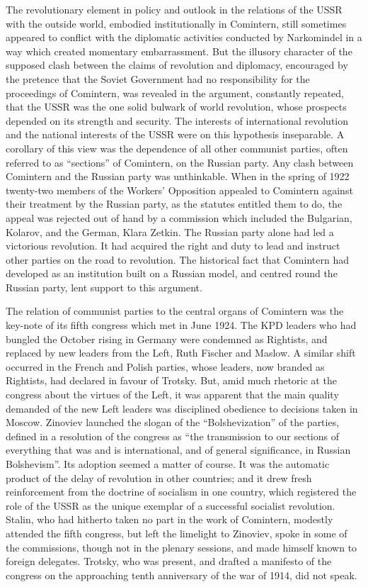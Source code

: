 The revolutionary element in policy and outlook in the relations of the USSR with the outside world, embodied institutionally in Comintern, still sometimes appeared to conflict with the diplomatic activities conducted by Narkomindel in a way which created momentary embarrassment. But the illusory character of the supposed clash between the claims of revolution and diplomacy, encouraged by the pretence that the Soviet Government had no responsibility for the proceedings of Comintern, was revealed in the argument, constantly repeated, that the USSR was the one solid bulwark of world revolution, whose prospects depended on its strength and security. The interests of international revolution and the national interests of the USSR were on this hypothesis inseparable. A corollary of this view was the dependence of all other communist parties, often referred to as ``sections'' of Comintern, on the Russian party. Any clash between Comintern and the Russian party was unthinkable. When in the spring of 1922 twenty-two members of the Workers' Opposition appealed to Comintern against their treatment by the Russian party, as the statutes entitled them to do, the appeal was rejected out of hand by a commission which included the Bulgarian, Kolarov, and the German, Klara Zetkin. The Russian party alone had led a victorious revolution. It had acquired the right and duty to lead and instruct other parties on the road to revolution. The historical fact that Comintern had developed as an institution built on a Russian model, and centred round the Russian party, lent support to this argument. 

The relation of communist parties to the central organs of Comintern was the key-note of its fifth congress which met in June 1924. The KPD leaders who had bungled the October rising in Germany were condemned as Rightists, and replaced by new leaders from the Left, Ruth Fischer and Maslow. A similar shift occurred in the French and Polish parties, whose leaders, now branded as Rightists, had declared in favour of Trotsky. But, amid much rhetoric at the congress about the virtues of the Left, it was apparent that the main quality demanded of the new Left leaders was disciplined obedience to decisions taken in Moscow. Zinoviev launched the slogan of the ``Bolshevization'' of the parties, defined in a resolution of the congress as ``the transmission to our sections of everything that was and is international, and of general significance, in Russian Bolshevism''. Its adoption seemed a matter of course. It was the automatic product of the delay of revolution in other countries; and it drew fresh reinforcement from the doctrine of socialism in one country, which registered the role of the USSR as the unique exemplar of a successful socialist revolution. Stalin, who had hitherto taken no part in the work of Comintern, modestly attended the fifth congress, but left the limelight to Zinoviev, spoke in some of the commissions, though not in the plenary sessions, and made himself known to foreign delegates. Trotsky, who was present, and drafted a manifesto of the congress on the approaching tenth anniversary of the war of 1914, did not speak. 

